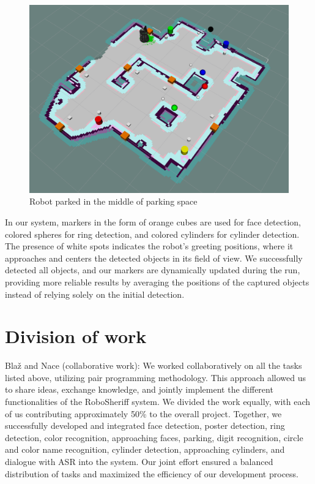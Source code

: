 \documentclass{article}
\begin{document}
\begin{figure}
  \centering
  \includegraphics[width=\textwidth]{images/markers.png}
  \caption{Robot parked in the middle of parking space}
  \label{fig:markers}
\end{figure}

In our system, markers in the form of orange cubes are used for face detection, colored spheres for ring detection, and colored cylinders for cylinder detection. The presence of white spots indicates the robot's greeting positions, where it approaches and centers the detected objects in its field of view. We successfully detected all objects, and our markers are dynamically updated during the run, providing more reliable results by averaging the positions of the captured objects instead of relying solely on the initial detection.

\section{Division of work}

Blaž and Nace (collaborative work):
We worked collaboratively on all the tasks listed above, utilizing pair programming methodology. This approach allowed us to share ideas, exchange knowledge, and jointly implement the different functionalities of the RoboSheriff system. We divided the work equally, with each of us contributing approximately 50\% to the overall project. Together, we successfully developed and integrated face detection, poster detection, ring detection, color recognition, approaching faces, parking, digit recognition, circle and color name recognition, cylinder detection, approaching cylinders, and dialogue with ASR into the system. Our joint effort ensured a balanced distribution of tasks and maximized the efficiency of our development process.
\end{document}
